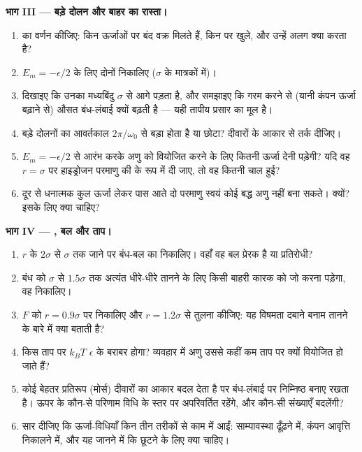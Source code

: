 \begin{problem}
\medskip
\noindent\textbf{भाग III --- बड़े दोलन और बाहर का रास्ता।}
\begin{enumerate}[resume]
  \item {} का वर्णन कीजिए: किन ऊर्जाओं पर बंद वक्र मिलते हैं, किन पर
        खुले, और उन्हें अलग क्या करता है?
  \item $E_m = -\epsilon/2$ के लिए दोनों  निकालिए ($\sigma$ के
        मात्रकों में)।
  \item दिखाइए कि उनका मध्यबिंदु $\sigma$ से आगे पड़ता है, और समझाइए कि
        गरम करने से (यानी कंपन ऊर्जा बढ़ाने से) औसत बंध-लंबाई क्यों बढ़ती
        है --- यही तापीय प्रसार का मूल है।
  \item बड़े दोलनों का आवर्तकाल $2\pi/\omega_0$ से बड़ा होता है या छोटा?
        दीवारों के आकार से तर्क दीजिए।
  \item $E_m = -\epsilon/2$ से आरंभ करके अणु को वियोजित करने के लिए कितनी
        ऊर्जा देनी पड़ेगी? यदि वह $r = \sigma$ पर हाइड्रोजन परमाणु की  के रूप में दी जाए, तो वह कितनी चाल हुई?
  \item दूर से धनात्मक कुल ऊर्जा लेकर पास आते दो परमाणु स्वयं कोई बद्ध अणु
        नहीं बना सकते। क्यों? इसके लिए क्या चाहिए?
\end{enumerate}

\medskip
\noindent\textbf{भाग IV --- , बल और ताप।}
\begin{enumerate}[resume]
  \item $r$ के $2\sigma$ से $\sigma$ तक जाने पर बंध-बल का  निकालिए।
        वहाँ वह बल प्रेरक है या प्रतिरोधी?
  \item बंध को $\sigma$ से $1.5\sigma$ तक अत्यंत धीरे-धीरे तानने के लिए
        किसी बाहरी कारक को जो  करना पड़ेगा, वह निकालिए।
  \item $F$ को $r = 0.9\sigma$ पर निकालिए और $r = 1.2\sigma$ से तुलना कीजिए:
        यह विषमता दबाने बनाम तानने के बारे में क्या बताती है?
  \item किस ताप पर $k_BT$ $\epsilon$ के बराबर होगा? व्यवहार में अणु उससे
        कहीं कम ताप पर क्यों वियोजित हो जाते हैं?
  \item कोई बेहतर प्रतिरूप (मोर्स) दीवारों का आकार बदल देता है पर
        बंध-लंबाई पर निम्निष्ठ बनाए रखता है। ऊपर के कौन-से परिणाम विधि के
        स्तर पर अपरिवर्तित रहेंगे, और कौन-सी संख्याएँ बदलेंगी?
  \item सार दीजिए कि ऊर्जा-विधियाँ किन तीन तरीकों से काम में आईं:
        साम्यावस्था ढूँढ़ने में, कंपन आवृत्ति निकालने में, और यह जानने में
        कि छूटने के लिए क्या चाहिए।
\end{enumerate}
\end{problem}
